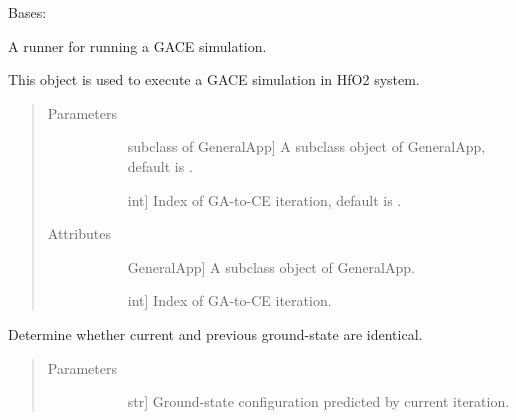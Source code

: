 \documentclass[letterpaper,10pt,english]{sphinxmanual}
\begin{document}
\begin{fulllineitems}
\label{\detokenize{pygace:pygace.general_gace.Runner}}
Bases: {\hyperref[\detokenize{pygace:pygace.gace.AbstractRunner}]{}}

A runner for running a GACE simulation.

This object is used to execute a GACE simulation in HfO2 system.
\begin{quote}\begin{description}
\item[{Parameters}] \leavevmode\begin{description}
\item[{}] \leavevmode{[}subclass of GeneralApp{]}
A subclass object of GeneralApp, default is .

\item[{}] \leavevmode{[}int{]}
Index of GA-to-CE iteration, default is .

\end{description}

\item[{Attributes}] \leavevmode\begin{description}
\item[{}] \leavevmode{[}GeneralApp{]}
A subclass object of GeneralApp.

\item[{}] \leavevmode{[}int{]}
Index of GA-to-CE iteration.

\end{description}

\end{description}\end{quote}

\begin{fulllineitems}
\label{\detokenize{pygace:pygace.general_gace.Runner.compare_gs}}
Determine whether current and previous ground-state are identical.
\begin{quote}\begin{description}
\item[{Parameters}] \leavevmode\begin{description}
\item[{}] \leavevmode{[}str{]}
Ground-state configuration predicted by current iteration.


\end{description}
\end{description}
\end{quote}
\end{fulllineitems}
\end{fulllineitems}
\end{document}
